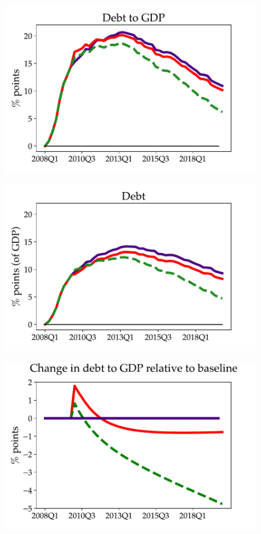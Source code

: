 \begin{figure}[t!]
\medskip
\begin{minipage}{0.51\textwidth}
\includegraphics[scale=.57]{text/chapter1/Figures/Fiscal_Consolidation_CounterFactual/debt2GDP_CounterFactual_Fiscal_Consolidation}
\label{fig:c}
\end{minipage}\hspace*{\fill}
\begin{minipage}{0.51\textwidth}
\includegraphics[scale=.57]{text/chapter1/Figures/Fiscal_Consolidation_CounterFactual/debt_CounterFactual_Fiscal_Consolidation}
 \label{fig:d}
\end{minipage}
\medskip
\begin{minipage}{0.51\textwidth}
\includegraphics[scale=.57]{text/chapter1/Figures/Fiscal_Consolidation_CounterFactual/change_in_debt2GDP_CounterFactual_Fiscal_Consolidation}

\end{minipage}
\end{figure}
